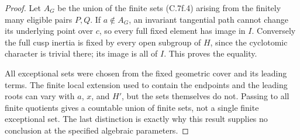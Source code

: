\begin{proof}
Let $A_G$ be the union of the finite sets (C.7f.4) arising from
the finitely many eligible pairs $P,Q$. If $a\notin A_G$, an
invariant tangential path cannot change its underlying point over
$c$, so every full fixed element has image in $I$. Conversely the
full cusp inertia is fixed by every open subgroup of $H$, since
the cyclotomic character is trivial there; its image is all of
$I$. This proves the equality.

All exceptional sets were chosen from the fixed geometric cover
and its leading terms. The finite local extension used to contain
the endpoints and the leading roots can vary with $a$, $x$, and
$H'$, but the sets themselves do not. Passing to all finite
quotients gives a countable union of finite sets, not a single
finite exceptional set. The last distinction is exactly why this
result supplies no conclusion at the specified algebraic
parameters.
\end{proof}
